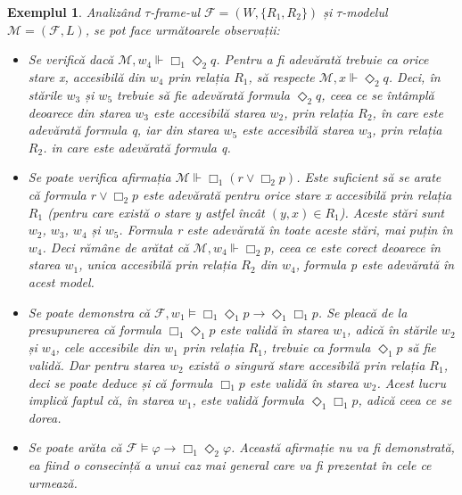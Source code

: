 \documentclass[12pt, openany]{book}
\newtheorem{example}[definition]{Exemplul} %
\begin{document}
\begin{example}
                Analizând $\tau$-\textit{frame}-ul $\mathcal{F}=(W,\{R_1,R_2\})$ și $\tau$-modelul $\mathcal{M}=(\mathcal{F},L)$,
                se pot face următoarele observații:
                \begin{itemize}
                    \item Se verifică dacă $\mathcal{M},w_4 \Vdash \Box_1\Diamond_2 q$. Pentru a fi adevărată trebuie ca
                    orice stare x, accesibilă din $w_4$ prin relația $R_1$, să respecte $\mathcal{M},x \Vdash \Diamond_2 q$.
                    Deci, în stările $w_3$ și $w_5$ trebuie să fie adevărată formula $\Diamond_2 q$, ceea ce se întâmplă 
                    deoarece din starea $w_3$ este accesibilă starea $w_2$, prin relația $R_2$, în care este adevărată
                    formula q, iar din starea $w_5$ este accesibilă starea $w_3$, prin relația $R_2$. in care este 
                    adevărată formula q.
                    \item Se poate verifica afirmația $\mathcal{M} \Vdash \Box_1 (r \vee \Box_2 p)$. Este suficient să 
                    se arate că formula $r \vee \Box_2 p$ este adevărată pentru orice stare x accesibilă prin relația $R_1$
                    (pentru care există o stare y astfel încât $(y,x) \in R_1$). Aceste stări sunt $w_2$, $w_3$, $w_4$ și $w_5$.
                    Formula r este adevărată în toate aceste stări, mai puțin în $w_4$. Deci rămâne de arătat că 
                    $\mathcal{M},w_4 \Vdash \Box_2 p$, ceea ce este corect deoarece în starea $w_1$, unica accesibilă prin 
                    relația $R_2$ din $w_4$, formula p este adevărată în acest model.
                    \item Se poate demonstra că $\mathcal{F},w_1 \vDash \Box_1 \Diamond_1 p \rightarrow \Diamond_1 \Box_1 p$.
                    Se pleacă de la presupunerea că formula $\Box_1 \Diamond_1 p$ este validă în starea $w_1$, adică în 
                    stările $w_2$ și $w_4$, cele accesibile din $w_1$ prin relația $R_1$, trebuie ca formula $\Diamond_1 p$
                    să fie validă. Dar pentru starea $w_2$ există o singură stare accesibilă prin relația $R_1$, deci se
                    poate deduce și că formula $\Box_1 p$ este validă în starea $w_2$. Acest lucru implică faptul că, în starea $w_1$, 
                    este validă formula $\Diamond_1 \Box_1 p$, adică ceea ce se dorea.
                    \item Se poate arăta că $\mathcal{F} \vDash \varphi \rightarrow \Box_1 \Diamond_2 \varphi$. Această 
                    afirmație nu va fi demonstrată, ea fiind o consecință a unui caz mai general care va fi prezentat în
                    cele ce urmează.
                \end{itemize}
            \end{example}
            
\end{document}
